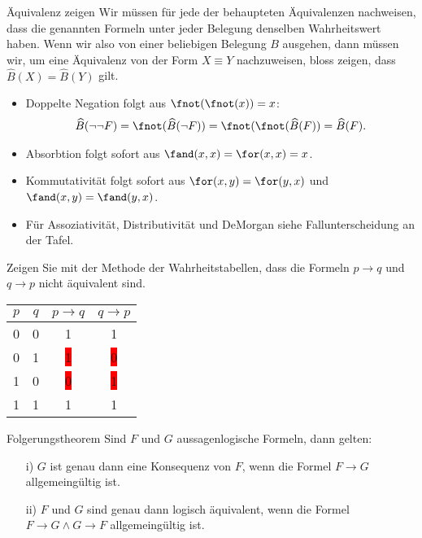 \begin{howto}{Äquivalenz zeigen}
    Wir müssen für jede der behaupteten Äquivalenzen nachweisen, dass die genannten Formeln unter jeder Belegung denselben Wahrheitswert haben. Wenn wir also von einer beliebigen Belegung $B$ ausgehen, dann müssen wir, um eine Äquivalenz von der Form $X\equiv Y$ nachzuweisen, bloss zeigen, dass $\widehat{B}(X)=\widehat{B}(Y)$ gilt.
    \begin{itemize}
        \item Doppelte Negation folgt aus $\fnot(\fnot(x))=x$:
            \begin{align*}
                \widehat{B}(\neg\neg F)=\fnot(\widehat{B}(\neg F))=\fnot(\fnot(\widehat{B}(F))=\widehat{B}(F).
            \end{align*}
        \item Absorbtion folgt sofort aus $\fand(x,x)=\for(x,x) =x$.
        \item Kommutativität folgt sofort aus $\for(x,y)=\for(y,x)$ und $\fand(x,y)=\fand(y,x)$.
        \item Für Assoziativität, Distributivität und DeMorgan siehe Fallunterscheidung an der Tafel.
    \end{itemize}
\end{howto}

\begin{example}
    Zeigen Sie mit der Methode der Wahrheitstabellen, dass die Formeln $p\to q$ und $q\to p$ nicht äquivalent sind.
    \tcblower
    \begin{center}
        \begin{tabular} {|c|c||c|c|}
            \hline
            $p$ & $q$ & $p\to q$ & $q \to p$ \\
            \hline
            0 & 0 & 1 & 1\\
            0 & 1 & \colorbox{red}{1} & \colorbox{red}{0}\\
            1 & 0 & \colorbox{red}{0} & \colorbox{red}{1}\\
            1 & 1 & 1 & 1\\
            \hline
        \end{tabular}
    \end{center}
\end{example}

\begin{theorem}{Folgerungstheorem}
    Sind $F$ und $G$ aussagenlogische Formeln, dann gelten:
    \begin{enumerate}
        \item[i)] $G$ ist genau dann eine Konsequenz von $F$, wenn die Formel $F\to G$ allgemeingültig ist.
        \item[ii)] $F$ und $G$ sind genau dann logisch äquivalent, wenn die Formel $F\to G\land G\to F$ allgemeingültig ist.
    \end{enumerate}
\end{theorem}

